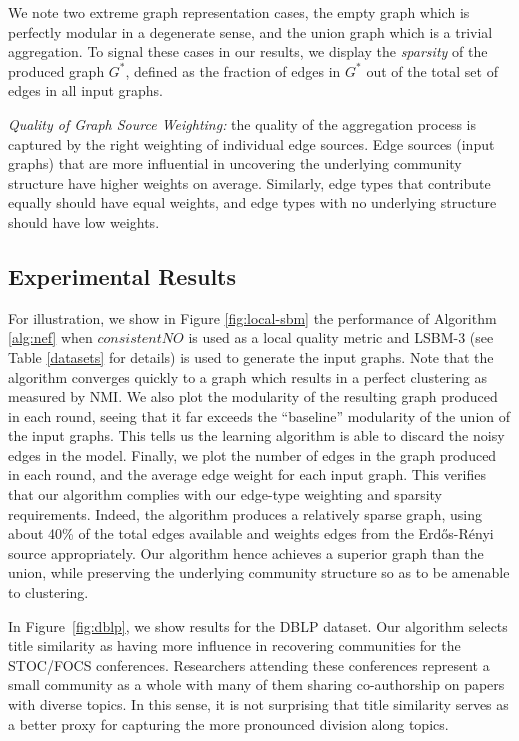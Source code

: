 \documentclass[twoside,twocolumn]{article}
\newcommand{\er}{Erd\H{o}s-R\'{e}nyi }
\begin{document}
We note two extreme graph representation cases, the empty graph which is
perfectly modular in a degenerate sense, and the union graph which is a trivial
aggregation. To signal these cases in our results, we display the
\emph{sparsity} of the produced graph $G^*$, defined as the fraction of edges
in $G^*$ out of the total set of edges in all input graphs. 

{\em Quality of Graph Source Weighting:} the quality of the aggregation process
is captured by the right weighting of individual edge sources. Edge sources (input
graphs) that are more influential in uncovering the underlying community
structure have higher weights on average. Similarly, edge types that contribute
equally should have equal weights, and edge types with no underlying structure
should have low weights.

\subsection{Experimental Results}

\label{sec:results}

For illustration, we show in Figure \ref{fig:local-sbm} the performance of
Algorithm \ref{alg:nef} when $consistentNO$ is used as a local quality metric
and LSBM-3 (see Table \ref{datasets} for details) is used to generate the input
graphs. Note that the algorithm converges quickly to a graph which results in a
perfect clustering as measured by NMI. We also plot the modularity of the
resulting graph produced in each round, seeing that it far exceeds the
``baseline'' modularity of the union of the input graphs. This tells us the
learning algorithm is able to discard the noisy edges in the model. Finally, we
plot the number of edges in the graph produced in each round, and the average
edge weight for each input graph. This verifies that our algorithm complies
with our edge-type weighting and sparsity requirements. Indeed, the algorithm
produces a relatively sparse graph, using about 40\% of the total edges
available and weights edges from the \er source appropriately.  Our algorithm
hence achieves a superior graph than the union, while preserving the underlying
community structure so as to be amenable to clustering. 

In Figure~\ref{fig:dblp}, we show results for the DBLP dataset. 
Our algorithm selects title similarity as having more influence in recovering communities for the STOC/FOCS conferences. Researchers attending these conferences represent a small community as a whole with many of them sharing co-authorship on papers with diverse topics. In this sense, it is not surprising that title similarity serves as a better proxy for capturing the more pronounced division along topics. 
\end{document}
